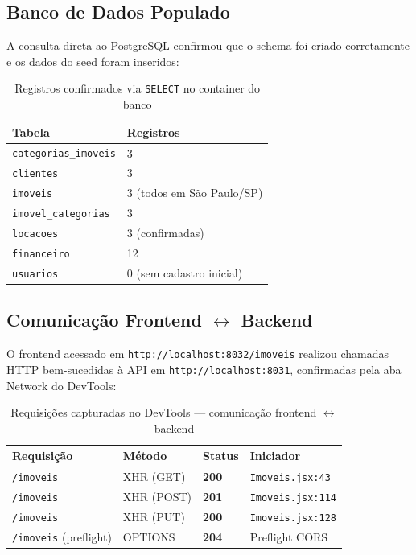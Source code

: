 \documentclass[12pt, a4paper]{article}
\newcommand{\thead}[1]{\cellcolor{tableheader}\color{white}\bfseries #1}
\newcommand{\talt}{\rowcolor{tablerowalt}}
\begin{document}
\subsection{Banco de Dados Populado}

A consulta direta ao PostgreSQL confirmou que o schema foi criado corretamente e os dados
do seed foram inseridos:

\begin{table}[H]
\centering
\begin{tabular}{|l|l|}
\hline
\thead{Tabela} & \thead{Registros} \\
\hline
\texttt{categorias\_imoveis} & 3 \\
\talt \texttt{clientes}           & 3 \\
\texttt{imoveis}             & 3 (todos em São Paulo/SP) \\
\talt \texttt{imovel\_categorias} & 3 \\
\texttt{locacoes}            & 3 (confirmadas) \\
\talt \texttt{financeiro}         & 12 \\
\texttt{usuarios}            & 0 (sem cadastro inicial) \\
\hline
\end{tabular}
\caption{Registros confirmados via \texttt{SELECT} no container do banco}
\end{table}

\subsection{Comunicação Frontend $\leftrightarrow$ Backend}

O frontend acessado em \texttt{http://localhost:8032/imoveis} realizou chamadas HTTP
bem-sucedidas à API em \texttt{http://localhost:8031}, confirmadas pela aba Network do
DevTools:

\begin{table}[H]
\centering
\begin{tabular}{|l|l|l|l|}
\hline
\thead{Requisição} & \thead{Método} & \thead{Status} & \thead{Iniciador} \\
\hline
\texttt{/imoveis}    & XHR (GET)  & \textbf{200} & \texttt{Imoveis.jsx:43} \\
\talt \texttt{/imoveis}   & XHR (POST) & \textbf{201} & \texttt{Imoveis.jsx:114} \\
\texttt{/imoveis}    & XHR (PUT)  & \textbf{200} & \texttt{Imoveis.jsx:128} \\
\talt \texttt{/imoveis} (preflight) & OPTIONS & \textbf{204} & Preflight CORS \\
\hline
\end{tabular}
\caption{Requisições capturadas no DevTools — comunicação frontend $\leftrightarrow$ backend}
\end{table}
\end{document}
